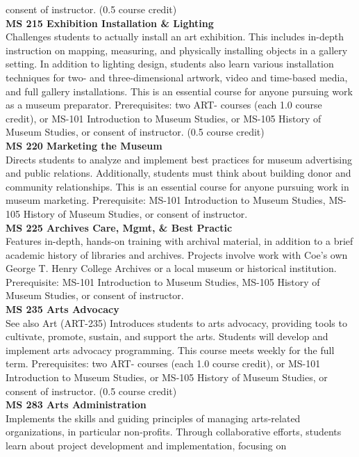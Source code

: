 \documentclass[
  letterpaper,
]{scrbook}
\begin{document}
consent of instructor. (0.5 course credit)\\
\textbf{MS 215 Exhibition Installation \& Lighting}\\
Challenges students to actually install an art exhibition. This includes
in-depth instruction on mapping, measuring, and physically installing
objects in a gallery setting. In addition to lighting design, students
also learn various installation techniques for two- and
three-dimensional artwork, video and time-based media, and full gallery
installations. This is an essential course for anyone pursuing work as a
museum preparator. Prerequisites: two ART- courses (each 1.0 course
credit), or MS-101 Introduction to Museum Studies, or MS-105 History of
Museum Studies, or consent of instructor. (0.5 course credit)\\
\textbf{MS 220 Marketing the Museum}\\
Directs students to analyze and implement best practices for museum
advertising and public relations. Additionally, students must think
about building donor and community relationships. This is an essential
course for anyone pursuing work in museum marketing. Prerequisite:
MS-101 Introduction to Museum Studies, MS-105 History of Museum Studies,
or consent of instructor.\\
\textbf{MS 225 Archives Care, Mgmt, \& Best Practic}\\
Features in-depth, hands-on training with archival material, in addition
to a brief academic history of libraries and archives. Projects involve
work with Coe's own George T. Henry College Archives or a local museum
or historical institution. Prerequisite: MS-101 Introduction to Museum
Studies, MS-105 History of Museum Studies, or consent of instructor.\\
\textbf{MS 235 Arts Advocacy}\\
See also Art (ART-235) Introduces students to arts advocacy, providing
tools to cultivate, promote, sustain, and support the arts. Students
will develop and implement arts advocacy programming. This course meets
weekly for the full term. Prerequisites: two ART- courses (each 1.0
course credit), or MS-101 Introduction to Museum Studies, or MS-105
History of Museum Studies, or consent of instructor. (0.5 course
credit)\\
\textbf{MS 283 Arts Administration}\\
Implements the skills and guiding principles of managing arts-related
organizations, in particular non-profits. Through collaborative efforts,
students learn about project development and implementation, focusing on
\end{document}
